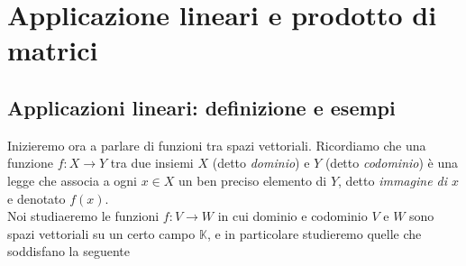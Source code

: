 \chapter{Applicazione lineari e prodotto di matrici}
\section{Applicazioni lineari: definizione e esempi\label{applin}}
Inizieremo ora a parlare di funzioni tra spazi vettoriali. Ricordiamo che una funzione $f:X\to Y$ tra due insiemi
$X$ (detto \textit{dominio}) e $Y$ (detto \textit{codominio}) è una legge che associa a ogni $x\in X$ un ben
preciso elemento di $Y$, detto \textit{immagine di $x$} e denotato $f(x)$.\\
Noi studiaeremo le funzioni $f:V\to W$ in cui dominio e codominio $V$ e $W$ sono spazi vettoriali su un certo
campo $\mathds{K}$, e in particolare studieremo quelle che soddisfano la seguente
